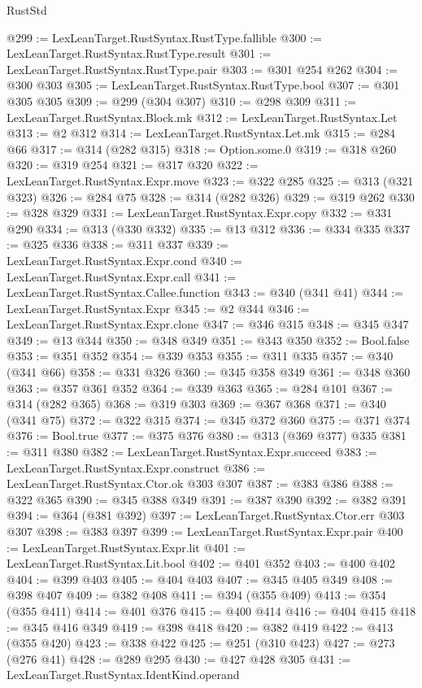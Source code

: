 \begin{lexlean}{RustStd}
\begin{coremodule}
{\begin{coremodule}
{{{{{{{{{@299 := LexLeanTarget.RustSyntax.RustType.fallible
@300 := LexLeanTarget.RustSyntax.RustType.result
@301 := LexLeanTarget.RustSyntax.RustType.pair
@303 := @301 @254 @262
@304 := @300 @303
@305 := LexLeanTarget.RustSyntax.RustType.bool
@307 := @301 @305 @305
@309 := @299 (@304 @307)
@310 := @298 @309
@311 := LexLeanTarget.RustSyntax.Block.mk
@312 := LexLeanTarget.RustSyntax.Let
@313 := @2 @312
@314 := LexLeanTarget.RustSyntax.Let.mk
@315 := @284 @66
@317 := @314 (@282 @315)
@318 := Option.some.{0}
@319 := @318 @260
@320 := @319 @254
@321 := @317 @320
@322 := LexLeanTarget.RustSyntax.Expr.move
@323 := @322 @285
@325 := @313 (@321 @323)
@326 := @284 @75
@328 := @314 (@282 @326)
@329 := @319 @262
@330 := @328 @329
@331 := LexLeanTarget.RustSyntax.Expr.copy
@332 := @331 @290
@334 := @313 (@330 @332)
@335 := @13 @312
@336 := @334 @335
@337 := @325 @336
@338 := @311 @337
@339 := LexLeanTarget.RustSyntax.Expr.cond
@340 := LexLeanTarget.RustSyntax.Expr.call
@341 := LexLeanTarget.RustSyntax.Callee.function
@343 := @340 (@341 @41)
@344 := LexLeanTarget.RustSyntax.Expr
@345 := @2 @344
@346 := LexLeanTarget.RustSyntax.Expr.clone
@347 := @346 @315
@348 := @345 @347
@349 := @13 @344
@350 := @348 @349
@351 := @343 @350
@352 := Bool.false
@353 := @351 @352
@354 := @339 @353
@355 := @311 @335
@357 := @340 (@341 @66)
@358 := @331 @326
@360 := @345 @358 @349
@361 := @348 @360
@363 := @357 @361 @352
@364 := @339 @363
@365 := @284 @101
@367 := @314 (@282 @365)
@368 := @319 @303
@369 := @367 @368
@371 := @340 (@341 @75)
@372 := @322 @315
@374 := @345 @372 @360
@375 := @371 @374
@376 := Bool.true
@377 := @375 @376
@380 := @313 (@369 @377) @335
@381 := @311 @380
@382 := LexLeanTarget.RustSyntax.Expr.succeed
@383 := LexLeanTarget.RustSyntax.Expr.construct
@386 := LexLeanTarget.RustSyntax.Ctor.ok @303 @307
@387 := @383 @386
@388 := @322 @365
@390 := @345 @388 @349
@391 := @387 @390
@392 := @382 @391
@394 := @364 (@381 @392)
@397 := LexLeanTarget.RustSyntax.Ctor.err @303 @307
@398 := @383 @397
@399 := LexLeanTarget.RustSyntax.Expr.pair
@400 := LexLeanTarget.RustSyntax.Expr.lit
@401 := LexLeanTarget.RustSyntax.Lit.bool
@402 := @401 @352
@403 := @400 @402
@404 := @399 @403
@405 := @404 @403
@407 := @345 @405 @349
@408 := @398 @407
@409 := @382 @408
@411 := @394 (@355 @409)
@413 := @354 (@355 @411)
@414 := @401 @376
@415 := @400 @414
@416 := @404 @415
@418 := @345 @416 @349
@419 := @398 @418
@420 := @382 @419
@422 := @413 (@355 @420)
@423 := @338 @422
@425 := @251 (@310 @423)
@427 := @273 (@276 @41)
@428 := @289 @295
@430 := @427 @428 @305
@431 := LexLeanTarget.RustSyntax.IdentKind.operand
}}}}}}}}}
\end{coremodule}}
\end{coremodule}
\end{lexlean}
